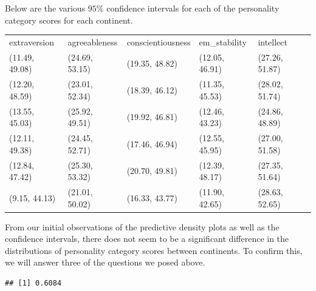 \documentclass[
]{article}
\begin{document}
Below are the various \(95\%\) confidence intervals for each of the
personality category scores for each continent.

\setlength{\tabcolsep}{6pt}
 \begin{table}
\centering

\label{tab:unnamed-chunk-12}\begin{tabular}{lllll}
  \multicolumn{1}{l}{extraversion} & \multicolumn{1}{l}{agreeableness} & \multicolumn{1}{l}{conscientiousness} & \multicolumn{1}{l}{em_stability} & \multicolumn{1}{l}{intellect}   \\ 
 \multicolumn{1}{l}{(11.49, 49.08)} & \multicolumn{1}{l}{(24.69, 53.15)} & \multicolumn{1}{l}{(19.35, 48.82)} & \multicolumn{1}{l}{(12.05, 46.91)} & \multicolumn{1}{l}{(27.26, 51.87)}   \\ 
 \multicolumn{1}{l}{(12.20, 48.59)} & \multicolumn{1}{l}{(23.01, 52.34)} & \multicolumn{1}{l}{(18.39, 46.12)} & \multicolumn{1}{l}{(11.35, 45.53)} & \multicolumn{1}{l}{(28.02, 51.74)}   \\ 
 \multicolumn{1}{l}{(13.55, 45.03)} & \multicolumn{1}{l}{(25.92, 49.51)} & \multicolumn{1}{l}{(19.92, 46.81)} & \multicolumn{1}{l}{(12.46, 43.23)} & \multicolumn{1}{l}{(24.86, 48.89)}   \\ 
 \multicolumn{1}{l}{(12.11, 49.38)} & \multicolumn{1}{l}{(24.45, 52.71)} & \multicolumn{1}{l}{(17.46, 46.94)} & \multicolumn{1}{l}{(12.55, 45.95)} & \multicolumn{1}{l}{(27.00, 51.58)}   \\ 
 \multicolumn{1}{l}{(12.84, 47.42)} & \multicolumn{1}{l}{(25.30, 53.32)} & \multicolumn{1}{l}{(20.70, 49.81)} & \multicolumn{1}{l}{(12.39, 48.17)} & \multicolumn{1}{l}{(27.35, 51.64)}   \\ 
 \multicolumn{1}{l}{(9.15, 44.13)} & \multicolumn{1}{l}{(21.01, 50.02)} & \multicolumn{1}{l}{(16.33, 43.77)} & \multicolumn{1}{l}{(11.90, 42.65)} & \multicolumn{1}{l}{(28.63, 52.65)}   \\ 

 \end{tabular}
\end{table}

From our initial observations of the predictive density plots as well as
the confidence intervals, there does not seem to be a significant
difference in the distributions of personality category scores between
continents. To confirm this, we will answer three of the questions we
posed above.

\begin{verbatim}
## [1] 0.6084
\end{verbatim}
\end{document}
